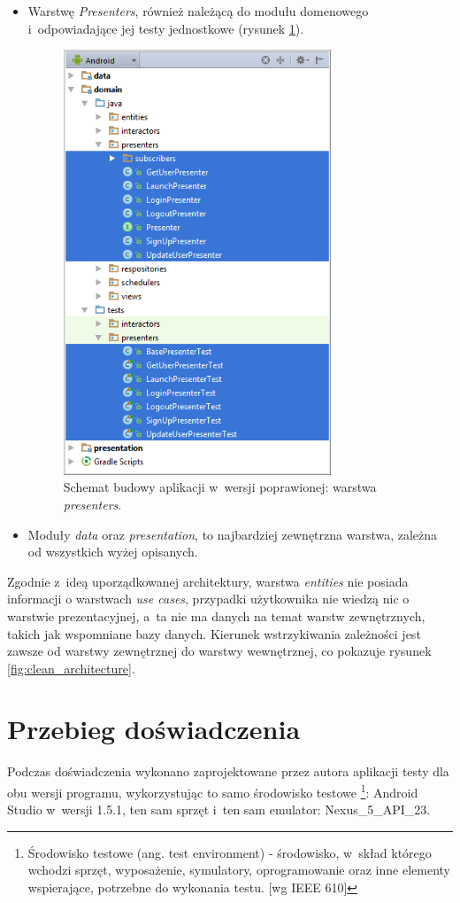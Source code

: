 \begin{itemize}
\item
Warstwę \textit{Presenters}, również należącą do modułu domenowego i~odpowiadające jej testy jednostkowe (rysunek \ref{fig:app_cl_presenters}).
\begin{figure}[!htb]
    \centering
    \includegraphics[width=8cm]{imgs/ch6_app_cl_presenters.png}
    \caption
{Schemat budowy aplikacji w~wersji poprawionej: warstwa \textit{presenters}.}
    \label{fig:app_cl_presenters}
\end{figure} 

\item
Moduły \textit{data} oraz \textit{presentation}, to najbardziej zewnętrzna warstwa, zależna od wszystkich wyżej opisanych. 
\end{itemize}

Zgodnie z~ideą uporządkowanej architektury, warstwa \textit{entities} nie posiada informacji o warstwach \textit{use cases}, przypadki użytkownika nie wiedzą nic o warstwie prezentacyjnej, a~ta nie ma danych na temat warstw zewnętrznych, takich jak wspomniane bazy danych. Kierunek wstrzykiwania zależności jest zawsze od warstwy zewnętrznej do warstwy wewnętrznej, co pokazuje rysunek \ref{fig:clean_architecture}.

\section{Przebieg doświadczenia}
Podczas doświadczenia wykonano zaprojektowane przez autora aplikacji testy dla obu wersji programu, wykorzystując to samo środowisko testowe \footnote{Środowisko testowe (ang. test environment) - środowisko, w~skład którego wchodzi sprzęt, wyposażenie, symulatory, oprogramowanie oraz inne elementy wspierające, potrzebne do wykonania testu. [wg IEEE 610]}: Android Studio w~wersji 1.5.1, ten sam sprzęt i~ten sam emulator: Nexus\_5\_API\_23.

